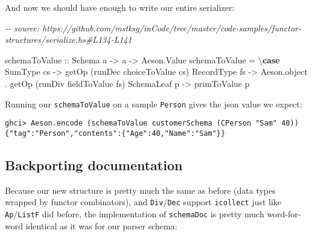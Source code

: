 \documentclass[]{article}
\newenvironment{Shaded}{}{}
\newcommand{\CommentTok}[1]{\textcolor[rgb]{0.38,0.63,0.69}{\textit{#1}}}
\newcommand{\DataTypeTok}[1]{\textcolor[rgb]{0.56,0.13,0.00}{#1}}
\newcommand{\KeywordTok}[1]{\textcolor[rgb]{0.00,0.44,0.13}{\textbf{#1}}}
\newcommand{\NormalTok}[1]{#1}
\newcommand{\OperatorTok}[1]{\textcolor[rgb]{0.40,0.40,0.40}{#1}}
\newcommand{\OtherTok}[1]{\textcolor[rgb]{0.00,0.44,0.13}{#1}}
\begin{document}
And now we should have enough to write our entire serializer:

\begin{Shaded}
\begin{Highlighting}[]
\CommentTok{{-}{-} source: https://github.com/mstksg/inCode/tree/master/code{-}samples/functor{-}structures/serialize.hs\#L134{-}L141}

\NormalTok{schemaToValue}
\OtherTok{    ::} \DataTypeTok{Schema}\NormalTok{ a}
    \OtherTok{{-}>}\NormalTok{ a}
    \OtherTok{{-}>} \DataTypeTok{Aeson.Value}
\NormalTok{schemaToValue }\OtherTok{=}\NormalTok{ \textbackslash{}}\KeywordTok{case}
    \DataTypeTok{SumType}\NormalTok{    cs }\OtherTok{{-}>}\NormalTok{ getOp (runDec choiceToValue cs)}
    \DataTypeTok{RecordType}\NormalTok{ fs }\OtherTok{{-}>}\NormalTok{ Aeson.object }\OperatorTok{.}\NormalTok{ getOp (runDiv fieldToValue fs)}
    \DataTypeTok{SchemaLeaf}\NormalTok{ p  }\OtherTok{{-}>}\NormalTok{ primToValue p}
\end{Highlighting}
\end{Shaded}

Running our \texttt{schemaToValue} on a sample \texttt{Person} gives the json
value we expect:

\begin{verbatim}
ghci> Aeson.encode (schemaToValue customerSchema (CPerson "Sam" 40))
{"tag":"Person","contents":{"Age":40,"Name":"Sam"}}
\end{verbatim}

\hypertarget{backporting-documentation-1}{%
\subsection{Backporting documentation}\label{backporting-documentation-1}}

Because our new structure is pretty much the same as before (data types wrapped
by functor combinators), and \texttt{Div}/\texttt{Dec} support \texttt{icollect}
just like \texttt{Ap}/\texttt{ListF} did before, the implementation of
\texttt{schemaDoc} is pretty much word-for-word identical as it was for our
parser schema:
\end{document}

